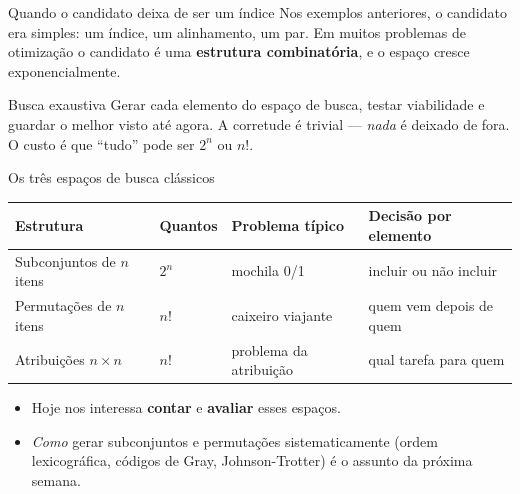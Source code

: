 \documentclass[aspectratio=169]{beamer}
\begin{document}
\begin{frame}{Quando o candidato deixa de ser um índice}
  Nos exemplos anteriores, o candidato era simples: um índice, um alinhamento,
  um par. Em muitos problemas de otimização o candidato é uma \textbf{estrutura
  combinatória}, e o espaço cresce exponencialmente.

  \begin{center}
  \end{center}

  \begin{block}{Busca exaustiva}
    Gerar cada elemento do espaço de busca, testar viabilidade e guardar o
    melhor visto até agora. A corretude é trivial --- \emph{nada} é deixado de
    fora. O custo é que ``tudo'' pode ser $2^n$ ou $n!$.
  \end{block}
\end{frame}

\begin{frame}{Os três espaços de busca clássicos}
  \begin{center}
  \small
  \begin{tabular}{@{}llll@{}}
    \toprule
    \textbf{Estrutura} & \textbf{Quantos} & \textbf{Problema típico} & \textbf{Decisão por elemento} \\
    \midrule
    Subconjuntos de $n$ itens & $2^n$   & mochila 0/1        & incluir ou não incluir \\
    Permutações de $n$ itens  & $n!$    & caixeiro viajante  & quem vem depois de quem \\
    Atribuições $n \times n$  & $n!$    & problema da atribuição & qual tarefa para quem \\
    \bottomrule
  \end{tabular}
  \end{center}

  \medskip
  \begin{itemize}
    \item Hoje nos interessa \textbf{contar} e \textbf{avaliar} esses espaços.
    \item \emph{Como} gerar subconjuntos e permutações sistematicamente (ordem
      lexicográfica, códigos de Gray, Johnson-Trotter) é o assunto da próxima
      semana.
  \end{itemize}
\end{frame}
\end{document}
